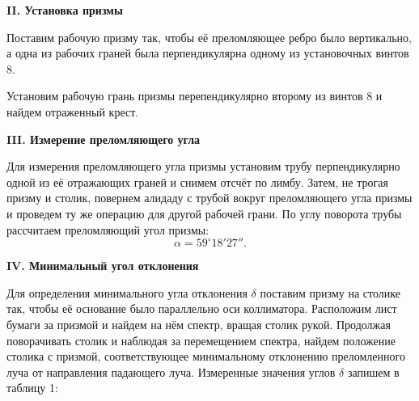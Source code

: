 \documentclass[a4paper,12pt]{article} %
\begin{document}
	\begin{center}
		\textbf{II. Установка призмы}
	\end{center}

	Поставим рабочую призму так, чтобы её преломляющее ребро было вертикально, а одна из рабочих граней была перпендикулярна одному из установочных винтов 8.
	
	Установим рабочую грань призмы перепендикулярно второму из винтов 8 и найдем отраженный крест.

	\begin{center}
		\textbf{III. Измерение преломляющего угла}
	\end{center}

	Для измерения преломляющего угла призмы установим трубу перпендикулярно одной из её отражающих граней и снимем отсчёт по лимбу. Затем, не трогая призму и столик, повернем алидаду с трубой вокруг преломляющего угла призмы и проведем ту же операцию для другой рабочей грани. По углу поворота трубы рассчитаем преломляющий угол призмы:
	\begin{equation*}
		\alpha = 59^\circ 18'27''.
	\end{equation*}

	\begin{center}
		\textbf{IV. Минимальный угол отклонения}
	\end{center}

	Для определения минимального угла отклонения $\delta$ поставим призму на столике так, чтобы её основание было параллельно оси коллиматора. Расположим лист бумаги за призмой и найдем на нём спектр, вращая столик рукой. Продолжая поворачивать столик и наблюдая за перемещением спектра, найдем положение столика с призмой, соответствующее минимальному отклонению преломленного луча от направления падающего луча. Измеренные значения углов $\delta$ запишем в таблицу 1:
	
	\newpage
	
	\begin{table}[h!]
		\centering
	\caption{Минимальные углы отклонения для линий}
	\end{table}
\end{document}
